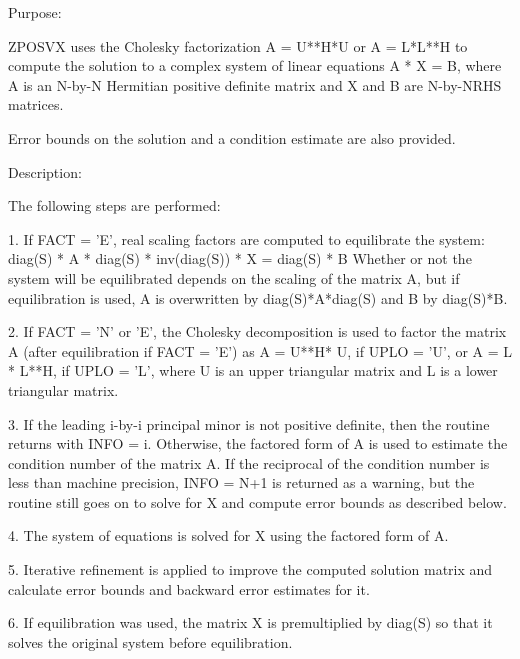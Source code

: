  \begin{DoxyParagraph}{Purpose\+: }
\begin{DoxyVerb} ZPOSVX uses the Cholesky factorization A = U**H*U or A = L*L**H to
 compute the solution to a complex system of linear equations
    A * X = B,
 where A is an N-by-N Hermitian positive definite matrix and X and B
 are N-by-NRHS matrices.

 Error bounds on the solution and a condition estimate are also
 provided.\end{DoxyVerb}
 
\end{DoxyParagraph}
\begin{DoxyParagraph}{Description\+: }
\begin{DoxyVerb} The following steps are performed:

 1. If FACT = 'E', real scaling factors are computed to equilibrate
    the system:
       diag(S) * A * diag(S) * inv(diag(S)) * X = diag(S) * B
    Whether or not the system will be equilibrated depends on the
    scaling of the matrix A, but if equilibration is used, A is
    overwritten by diag(S)*A*diag(S) and B by diag(S)*B.

 2. If FACT = 'N' or 'E', the Cholesky decomposition is used to
    factor the matrix A (after equilibration if FACT = 'E') as
       A = U**H* U,  if UPLO = 'U', or
       A = L * L**H,  if UPLO = 'L',
    where U is an upper triangular matrix and L is a lower triangular
    matrix.

 3. If the leading i-by-i principal minor is not positive definite,
    then the routine returns with INFO = i. Otherwise, the factored
    form of A is used to estimate the condition number of the matrix
    A.  If the reciprocal of the condition number is less than machine
    precision, INFO = N+1 is returned as a warning, but the routine
    still goes on to solve for X and compute error bounds as
    described below.

 4. The system of equations is solved for X using the factored form
    of A.

 5. Iterative refinement is applied to improve the computed solution
    matrix and calculate error bounds and backward error estimates
    for it.

 6. If equilibration was used, the matrix X is premultiplied by
    diag(S) so that it solves the original system before
    equilibration.\end{DoxyVerb}
 
\end{DoxyParagraph}

